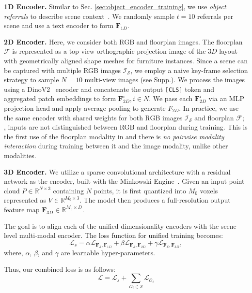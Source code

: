 \noindent \textbf{1D Encoder.} Similar to Sec. \ref{sec:object_encoder_training}, we use \textit{object referrals} to describe scene context~\cite{3dvista}. We randomly sample $t=10$ referrals per scene and use a text encoder to form $\mathbf{F}_{1D}$.

\noindent \textbf{2D Encoder.} Here, we consider both RGB and floorplan images. The floorplan $\mathcal{F}$ is represented as a top-view orthographic projection image of the $3D$ layout with geometrically aligned shape meshes for furniture instances. Since a scene can be captured with multiple RGB images $\mathcal{I}_\mathcal{S}$, we employ a naive key-frame selection strategy to sample $N=10$ multi-view images (see Supp.). We process the images using a DinoV2~\cite{oquab2023dinov2} encoder and concatenate the output \texttt{[CLS]} token and aggregated patch embeddings to form $\mathbf{F}_{2D}^i, i \in N$. We pass each $\mathbf{F}_{2D}^i$ via an MLP projection head and apply average pooling to generate $F_{2D}$. In practice, we use the same encoder with shared weights for both RGB images $\mathcal{I}_\mathcal{S}$ and floorplan $\mathcal{F}$; \ie, inputs are not distinguished between RGB and floorplan during training. This is the first use of the floorplan modality in \project{} and there is \textit{no pairwise modality interaction} during training between it and the image modality, unlike other modalities.

\noindent \textbf{3D Encoder.} We utilize a sparse convolutional architecture with a residual network as the encoder, built with the Minkowski Engine~\cite{choy20194d}. Given an input point cloud $P \in \mathbb{R}^{N \times 3}$ containing $N$ points, it is first quantized into $M_0$ voxels represented as $V \in \mathbb{R}^{M_0 \times 3}$. The model then produces a full-resolution output feature map $\mathbf{F}_{3D} \in \mathbb{R}^{M_0 \times D}$.

\par The goal is to align each of the unified dimensionality encoders with the scene-level multi-modal encoder. The loss function for unified training becomes:
\begin{equation}
    \mathcal{L}_s = \alpha \mathcal{L}_{\mathbf{F}_{\mathcal{S}}, \mathbf{F}_{1D}} + \beta \mathcal{L}_{\mathbf{F}_{\mathcal{S}}, \mathbf{F}_{2D}} + \gamma \mathcal{L}_{\mathbf{F}_{\mathcal{S}}, \mathbf{F}_{3D}},
\end{equation}
where, $\alpha$, $\beta$, and $\gamma$ are learnable hyper-parameters.

Thus, our combined loss is as follows:
\begin{equation}
    \mathcal{L} = \mathcal{L}_s + \sum_{\mathcal{O}_i \in \mathcal{S}} \mathcal{L}_{\mathcal{O}_i}
    \label{eq:loss_objective}
\end{equation}

